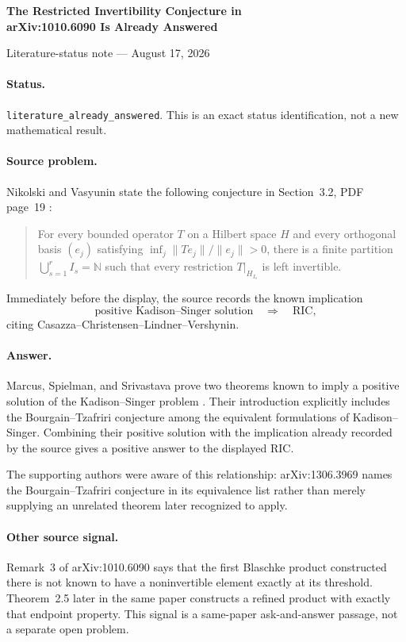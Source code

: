 \documentclass[10pt]{article}
\begin{document}
\begin{center}
{\Large\bfseries The Restricted Invertibility Conjecture in\\
arXiv:1010.6090 Is Already Answered\par}
\smallskip
{\small Literature-status note --- August 17, 2026}
\end{center}
\small

\paragraph{Status.}
\texttt{literature\_already\_answered}.  This is an exact status
identification, not a new mathematical result.

\paragraph{Source problem.}
Nikolski and Vasyunin state the following conjecture in Section~3.2,
PDF page~19 \cite{NV}:
\begin{quote}
For every bounded operator $T$ on a Hilbert space $H$ and every orthogonal
basis $(e_j)$ satisfying
$\inf_j\|Te_j\|/\|e_j\|>0$, there is a finite partition
$\bigcup_{s=1}^r I_s=\mathbb N$ such that every restriction
$T|_{H_{I_s}}$ is left invertible.
\end{quote}
Immediately before the display, the source records the known implication
\[
 \text{positive Kadison--Singer solution}\quad\Longrightarrow\quad
 \text{RIC},
\]
citing Casazza--Christensen--Lindner--Vershynin.

\paragraph{Answer.}
Marcus, Spielman, and Srivastava prove two theorems known to imply a positive
solution of the Kadison--Singer problem \cite[abstract and Corollary~1.5]{MSS}.
Their introduction explicitly includes the Bourgain--Tzafriri conjecture
among the equivalent formulations of Kadison--Singer.  Combining their
positive solution with the implication already recorded by the source gives
a positive answer to the displayed RIC.

The supporting authors were aware of this relationship: arXiv:1306.3969
names the Bourgain--Tzafriri conjecture in its equivalence list rather than
merely supplying an unrelated theorem later recognized to apply.

\paragraph{Other source signal.}
Remark~3 of arXiv:1010.6090 says that the first Blaschke product constructed
there is not known to have a noninvertible element exactly at its threshold.
Theorem~2.5 later in the same paper constructs a refined product with exactly
that endpoint property.  This signal is a same-paper ask-and-answer passage,
not a separate open problem.
\end{document}

